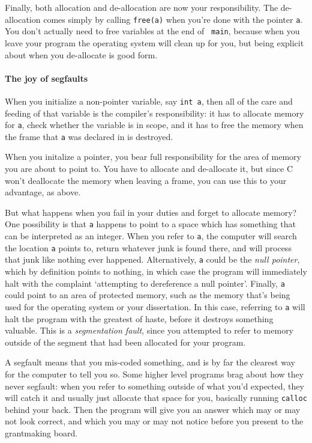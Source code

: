 \documentclass[12pt]{article}
\makeatletter
\def\ttindex#1{\index{#1@{\tt #1}}}
\makeatother
\begin{document}
Finally, both allocation and de-allocation are now your
responsibility. The de-allocation comes simply by calling {\tt free(a)} \ttindex{free}
when you're done with the pointer {\tt a}. You don't actually need to free variables at the end of {\tt
main}, because when you leave your program the operating system will clean up for you, but being explicit
about when you de-allocate is good form.

\paragraph{The joy of segfaults}  
When you initialize a non-pointer variable, say {\tt int a}, then all of
the care and feeding of that variable is the compiler's responsibility:
it has to allocate memory for {\tt a}, check whether the variable is
in scope, and it has to free the memory when the frame that {\tt a}
was declared in is destroyed.

When you initalize a pointer, you bear full responsibility for the area
of memory you are about to point to. You have to allocate and de-allocate
it, but since C won't deallocate the memory when leaving a frame, you
can use this to your advantage, as above.

But what happens when you fail in your duties and forget to allocate
memory? One possibility is that {\tt a} happens to point to a space
which has something that can be interpreted as an integer. When you refer
to {\tt *a}, the computer will search the location {\tt a}
points to, return whatever junk is found there, and will process that
junk like nothing ever happened. Alternatively, {\tt a} could be the
{\sl null pointer},  which by definition points to nothing, in which
case the program will immediately halt with the complaint `attempting to
dereference a null pointer'. Finally, {\tt a} could point to an area of
protected memory, such as the memory that's being used for the operating
system or your dissertation. In this case, referring to {\tt *a} will
halt the program with the greatest of haste, before it destroys something
valuable. This is a {\sl segmentation fault}, since you attempted to refer
to memory outside of the segment that had been allocated for your program.

A segfault means that you mis-coded something, and 
is by far the clearest way for the computer to tell you so. Some higher level
programs brag about how they never segfault: when you refer to something
outside of what you'd expected, they will catch it and usually just
allocate that space for you, basically running {\tt calloc} behind your
back. Then the program will give you an answer which may or may not look
correct, and which you may or may not notice before you present to the
grantmaking board. 
\end{document}
